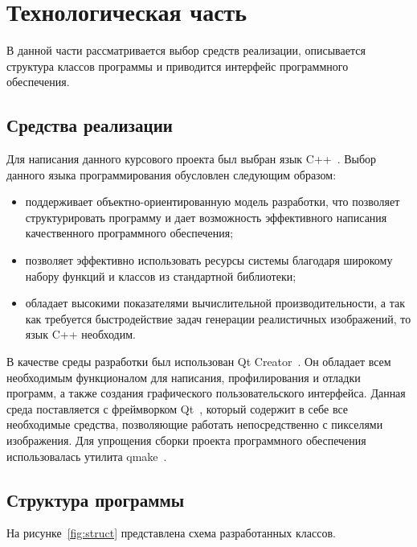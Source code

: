 \section{Технологическая часть}
В данной части рассматривается выбор средств реализации, описывается структура классов программы и приводится интерфейс программного обеспечения.

\subsection{Средства реализации}

Для написания данного курсового проекта был выбран язык C++~\cite{cpp-lang}.
Выбор данного языка программирования обусловлен следующим образом:
\begin{itemize}
	\item поддерживает объектно-ориентированную модель разработки, что позволяет структурировать программу и дает возможность эффективного написания качественного программного обеспечения;
	\item позволяет эффективно использовать ресурсы системы благодаря широкому набору функций и классов из стандартной библиотеки;
	\item обладает высокими показателями вычислительной производительности, а так как требуется быстродействие задач генерации реалистичных изображений, то язык C++ необходим.
\end{itemize}

В качестве среды разработки был использован Qt Creator~\cite{qt-creator}. 
Он обладает всем необходимым функционалом для написания, профилирования и отладки программ, а также создания графического пользовательского интерфейса.
Данная среда поставляется с фреймворком Qt~\cite{qt-framefork}, который содержит в себе все необходимые средства, позволяющие работать непосредственно с пикселями изображения.
Для упрощения сборки проекта программного обеспечения использовалась утилита qmake~\cite{qmake}.

\subsection{Структура программы}

На рисунке~\ref{fig:struct} представлена схема разработанных классов.

